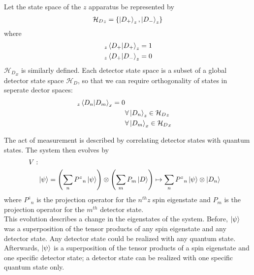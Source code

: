 Let the state space of the $z$ apparatus be represented by
\begin{align*}
    {\mathcal{H}_D}_z =  \{\ket{D_+}_z, \ket{D_-}_z\}
\end{align*}
where
\begin{align*}
    _z\braket{D_+|D_+}_z&=1 \\
    _z\braket{D_+|D_-}_z&=0
\end{align*}
${\mathcal{H}_D}_x$ is similarly defined. Each detector state space is a subset of a global detector state space $\mathcal{H}_D$, so that we can require orthogonality of states in seperate dector spaces:
\begin{align*}
    _z\braket{D_n|D_m}_x=0 \\
    & \forall \ket{D_n}_z \in {\mathcal{H}_D}_z \\
    & \forall \ket{D_m}_x \in {\mathcal{H}_D}_x
\end{align*}

The act of measurement is described by correlating detector states with quantum states. The system then evolves by
\begin{align}
    \nonumber V: \\
    & \ket{\psi} = \left(\sum_{n} {P^z}_n\ket{\psi}\right) \otimes \left(\sum_{m} P_m\ket{D}\right) \mapsto \sum_{n} {P^z}_n\ket{\psi} \otimes \ket{D_n}
\end{align}
where ${P^z}_n$ is the projection operator for the $n^{th} z$ spin eigenstate and $P_m$ is the projection operator for the $m^{th}$ detector state. \\

This evolution describes a change in the eigenstates of the system. Before, $\ket{\psi}$ was a superposition of the tensor products of any spin eigenstate and any detector state. Any detector state could be realized with any quantum state. Afterwards, $\ket{\psi}$ is a superposition of the tensor products of a spin eigenstate and one specific detector state; a detector state can be realized with one specific quantum state only.


